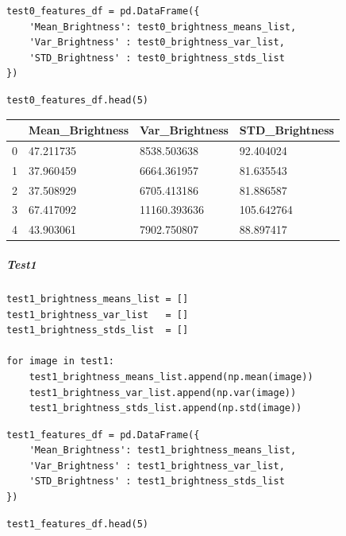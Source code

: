 \begin{verbatim}
test0_features_df = pd.DataFrame({
    'Mean_Brightness': test0_brightness_means_list,
    'Var_Brightness' : test0_brightness_var_list,
    'STD_Brightness' : test0_brightness_stds_list
})
\end{verbatim}

\begin{verbatim}
test0_features_df.head(5)
\end{verbatim}

\bigskip\noindent
\begin{tabular}{p{}p{}p{}p{}}
\toprule
 & Mean\_Brightness & Var\_Brightness & STD\_Brightness \\
\hline
0 & 47.211735 & 8538.503638 & 92.404024 \\
\hline
1 & 37.960459 & 6664.361957 & 81.635543 \\
\hline
2 & 37.508929 & 6705.413186 & 81.886587 \\
\hline
3 & 67.417092 & 11160.393636 & 105.642764 \\
\hline
4 & 43.903061 & 7902.750807 & 88.897417 \\
\hline
\bottomrule
\end{tabular}

\bigskip

\subparagraph{Test1}

\begin{verbatim}
test1_brightness_means_list = []
test1_brightness_var_list   = []
test1_brightness_stds_list  = []

for image in test1:
    test1_brightness_means_list.append(np.mean(image))
    test1_brightness_var_list.append(np.var(image))
    test1_brightness_stds_list.append(np.std(image))
\end{verbatim}

\begin{verbatim}
test1_features_df = pd.DataFrame({
    'Mean_Brightness': test1_brightness_means_list,
    'Var_Brightness' : test1_brightness_var_list,
    'STD_Brightness' : test1_brightness_stds_list
})
\end{verbatim}

\begin{verbatim}
test1_features_df.head(5)
\end{verbatim}

